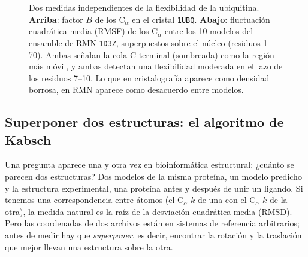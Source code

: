 \begin{figure}[t]
\centering
{}
\caption[Flexibilidad de la ubiquitina medida de dos formas]{Dos medidas independientes de la flexibilidad de la ubiquitina. \textbf{Arriba}: factor $B$ de los C$_\alpha$ en el cristal \texttt{1UBQ}. \textbf{Abajo}: fluctuación cuadrática media (RMSF) de los C$_\alpha$ entre los 10 modelos del ensamble de RMN \texttt{1D3Z}, superpuestos sobre el núcleo (residuos 1--70). Ambas señalan la cola C-terminal (sombreada) como la región más móvil, y ambas detectan una flexibilidad moderada en el lazo de los residuos 7--10. Lo que en cristalografía aparece como densidad borrosa, en RMN aparece como desacuerdo entre modelos.}
\label{fig:15-ubq}
\end{figure}

\subsection{Superponer dos estructuras: el algoritmo de Kabsch}

Una pregunta aparece una y otra vez en bioinformática estructural: ¿cuánto se parecen dos estructuras? Dos modelos de la misma proteína, un modelo predicho y la estructura experimental, una proteína antes y después de unir un ligando. Si tenemos una correspondencia entre átomos (el C$_\alpha$ $k$ de una con el C$_\alpha$ $k$ de la otra), la medida natural es la raíz de la desviación cuadrática media (RMSD). Pero las coordenadas de dos archivos están en sistemas de referencia arbitrarios; antes de medir hay que \emph{superponer}, es decir, encontrar la rotación y la traslación que mejor llevan una estructura sobre la otra.

